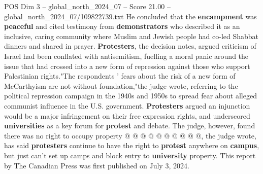 \begin{textsample}{POS Dim 3 – global\_north\_2024\_07 – Score 21.00 – global\_north\_2024\_07/109822739.txt}
He concluded that the \textbf{encampment} was \textbf{peaceful} and cited testimony from \textbf{demonstrators} who described it as an inclusive, caring community where Muslim and Jewish people had co-led Shabbat dinners and shared in prayer. \textbf{Protesters}, the decision notes, argued criticism of Israel had been conflated with antisemitism, fuelling a moral panic around the issue that had crossed into a new form of repression against those who support Palestinian rights."The respondents ' fears about the risk of a new form of McCarthyism are not without foundation,"the judge wrote, referring to the political repression campaign in the 1940s and 1950s to spread fear about alleged communist influence in the U.S. government. \textbf{Protesters} argued an injunction would be a major infringement on their free expression rights, and underscored \textbf{universities} as a key forum for \textbf{protest} and debate.
The judge, however, found there was no right to occupy property @ @ @ @ @ @ @ @ @ @, the judge wrote, has said \textbf{protesters} continue to have the right to \textbf{protest} anywhere on \textbf{campus}, but just can't set up camps and block entry to \textbf{university} property.
This report by The Canadian Press was first published on July 3, 2024.

\end{textsample}
